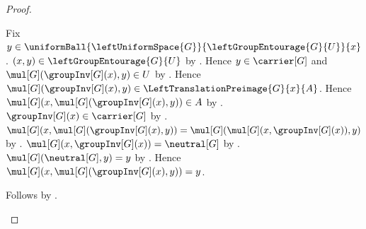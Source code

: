 \begin{proof}
\begin{subproof}
\begin{subproof}
\begin{subproof}
                Fix $y\in\uniformBall{\leftUniformSpace{G}}
                    {\leftGroupEntourage{G}{U}}{x}$.
                $(x,y)\in\leftGroupEntourage{G}{U}$
                    by .
                Hence $y\in\carrier[G]$ and
                    $\mul[G](\groupInv[G](x),y)\in U$
                    by .
                Hence $\mul[G](\groupInv[G](x),y)
                    \in\LeftTranslationPreimage{G}{x}{A}$.
                Hence
                    $\mul[G](x,\mul[G](\groupInv[G](x),y))\in A$
                    by .
                $\groupInv[G](x)\in\carrier[G]$
                    by .
                $\mul[G](x,\mul[G](\groupInv[G](x),y))
                    =\mul[G](\mul[G](x,\groupInv[G](x)),y)$
                    by .
                $\mul[G](x,\groupInv[G](x))=\neutral[G]$
                    by .
                $\mul[G](\neutral[G],y)=y$ by .
                Hence $\mul[G](x,\mul[G](\groupInv[G](x),y))=y$.
            \end{subproof}
        \end{subproof}
        Follows by .
    \end{subproof}


\end{proof}
